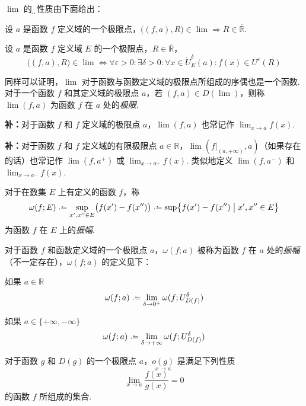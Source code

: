 \begin{definition}
    $\lim$ 的\d{部}\d{分}性质由下面给出：
    
    设 $a$ 是函数 $f$ 定义域的一个极限点，$\bigl((f,a),R\bigr) \in \lim \Rightarrow R \in \overline{\mathbb{R}}$.

    设 $a$ 是函数 $f$ 定义域 $E$ 的一个极限点，$R \in \overline{\mathbb{R}}$，
    \[\bigl((f,a),R\bigr) \in \lim \Leftrightarrow \forall \varepsilon > 0: \exists \delta > 0: \forall x \in \mathring{U}_E^\delta(a): f(x) \in U^\varepsilon(R)\]

    同样可以证明，$\lim$ 对于函数与函数定义域的极限点所组成的序偶也是一个函数. 对于一个函数 $f$ 和其定义域的极限点 $a$，若 $(f,a) \in D(\lim)$，则称 $\lim(f,a)$ 为函数 $f$ 在 $a$ 处的\emph{极限}.

    \textbf{补：}对于函数 $f$ 和 $f$ 定义域的极限点 $a$，$\lim(f,a)$ 也常记作 $\displaystyle \lim_{x \rightarrow a} f(x)$.

    \textbf{补：}对于函数 $f$ 和 $f$ 定义域的有限极限点 $a \in \mathbb{R}$，$\lim(f|_{(a,+\infty)},a)$（如果存在的话）也常记作 $\lim(f,a^+)$ 或 $\displaystyle \lim_{x \rightarrow a^+} f(x)$. 类似地定义 $\lim(f,a^-)$ 和 $\displaystyle \lim_{x \rightarrow a^-} f(x)$.
\end{definition}\vspace{9pt}

\begin{definition}
    对于在数集 $E$ 上有定义的函数 $f$，称
    \[\omega(f;E) \defeq \sup_{x',x'' \in E} \bigl(f(x') - f(x'')\bigr) \defeq \sup \bigl\{f(x') - f(x'') \bigm| x',x'' \in E\bigr\}\]
    为函数 $f$ 在 $E$ 上的\emph{振幅}.
\end{definition}\vspace{9pt}

\begin{definition}
    对于函数 $f$ 和函数定义域的一个极限点 $a$，$\omega(f;a)$ 被称为函数 $f$ 在 $a$ 处的\emph{振幅}（不一定存在），$\omega(f;a)$ 的定义见下：

    如果 $a \in \mathbb{R}$
    \[\omega(f;a) \defeq \lim_{\delta \rightarrow 0^+} \omega(f;U_{D(f)}^\delta)\]
    
    如果 $a \in \{+\infty, -\infty\}$
    \[\omega(f;a) \defeq \lim_{\delta \rightarrow +\infty} \omega(f;U_{D(f)}^\delta)\]
\end{definition}\vspace{9pt}

\begin{subdefinition}
    对于函数 $g$ 和 $D(g)$ 的一个极限点 $a$，$\underset{x \rightarrow a}{o(g)}$ 是满足下列性质
    \[\lim_{x \rightarrow a} \frac{f(x)}{g(x)} = 0\]
    的函数 $f$ 所组成的集合. 
\end{subdefinition}

